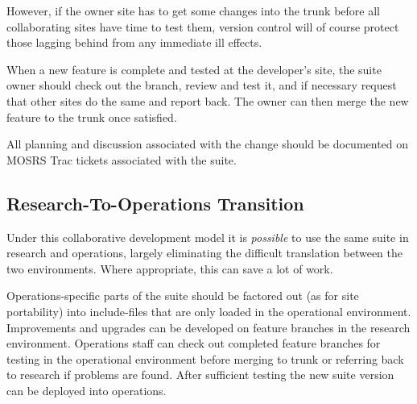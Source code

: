 However, if the owner site has to get some changes into the trunk before all
collaborating sites have time to test them, version control will of course
protect those lagging behind from any immediate ill effects.

When a new feature is complete and tested at the developer's site, the suite
owner should check out the branch, review and test it, and if necessary request
that other sites do the same and report back. The owner can then merge the
new feature to the trunk once satisfied.

All planning and discussion associated with the change should be documented on
MOSRS Trac tickets associated with the suite.

\subsection{Research-To-Operations Transition}

Under this collaborative development model it is {\em possible} to use the
same suite in research and operations, largely eliminating the difficult
translation between the two environments. Where appropriate, this can save
a lot of work.

Operations-specific parts of the suite should be factored out (as for site
portability) into include-files that are only loaded in the operational
environment. Improvements and upgrades can be developed on feature branches in
the research environment. Operations staff can check out completed feature
branches for testing in the operational environment before merging to trunk or
referring back to research if problems are found. After sufficient testing the
new suite version can be deployed into operations.

